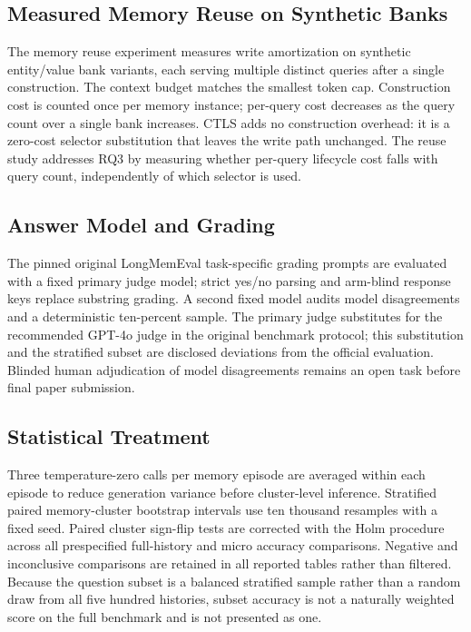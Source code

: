 \subsection{Measured Memory Reuse on Synthetic Banks}

\label{sec:setup_memory_reuse}

The memory reuse experiment measures write amortization on synthetic entity/value bank variants, each serving multiple distinct queries after a single construction. The context budget matches the smallest token cap. Construction cost is counted once per memory instance; per-query cost decreases as the query count over a single bank increases. CTLS adds no construction overhead: it is a zero-cost selector substitution that leaves the write path unchanged. The reuse study addresses RQ3 by measuring whether per-query lifecycle cost falls with query count, independently of which selector is used.

\subsection{Answer Model and Grading}

\label{sec:setup_grading}

The pinned original LongMemEval task-specific grading prompts are evaluated with a fixed primary judge model; strict yes/no parsing and arm-blind response keys replace substring grading. A second fixed model audits model disagreements and a deterministic ten-percent sample. The primary judge substitutes for the recommended GPT-4o judge in the original benchmark protocol; this substitution and the stratified subset are disclosed deviations from the official evaluation. Blinded human adjudication of model disagreements remains an open task before final paper submission.

\subsection{Statistical Treatment}

\label{sec:setup_stats}

Three temperature-zero calls per memory episode are averaged within each episode to reduce generation variance before cluster-level inference. Stratified paired memory-cluster bootstrap intervals use ten thousand resamples with a fixed seed. Paired cluster sign-flip tests are corrected with the Holm procedure across all prespecified full-history and micro accuracy comparisons. Negative and inconclusive comparisons are retained in all reported tables rather than filtered. Because the question subset is a balanced stratified sample rather than a random draw from all five hundred histories, subset accuracy is not a naturally weighted score on the full benchmark and is not presented as one.

